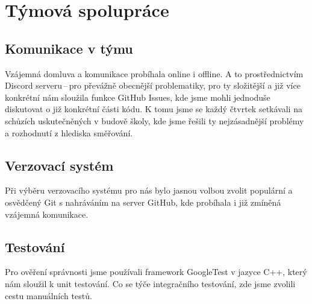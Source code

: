 \documentclass[a4paper, 12pt]{article}
\begin{document}
    \section{Týmová spolupráce}
    \label{teamwork}
    \subsection{Komunikace v týmu}
        Vzájemná domluva a komunikace probíhala online i offline. A to prostřednictvím Discord serveru\,--\,pro převážně obecnější problematiky, pro ty složitější a již více konkrétní nám sloužila funkce GitHub Issues, kde jsme mohli jednoduše diskutovat o již konkrétní části kódu. K tomu jsme se každý čtvrtek setkávali na schůzích uskutečněných v budově školy, kde jsme řešili ty nejzásadnější problémy a rozhodnutí z hlediska směřování.
    \subsection{Verzovací systém}
        Při výběru verzovacího systému pro nás bylo jasnou volbou zvolit populární a osvědčený Git s nahráváním na server GitHub, kde probíhala i již zmíněná vzájemná komunikace.
    \subsection{Testování}
        Pro ověření správnosti jsme používali framework GoogleTest v jazyce C++, který nám sloužil k unit testování. Co se týče integračního testování, zde jsme zvolili cestu manuálních testů.
\end{document}
